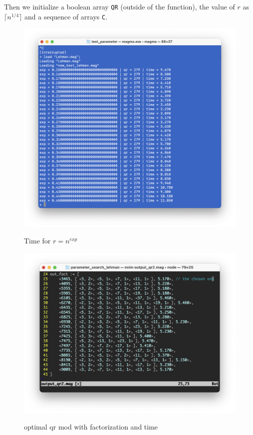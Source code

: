 \documentclass{article}
\theoremstyle{plain}
\theoremstyle{remark}
\theoremstyle{definition}
\begin{document}
Then we initialize a boolean array \texttt{QR} (outside of the function), the value of $r$ as $\lceil n^{1/4} \rceil$ and a sequence of arrays \texttt{C}. 



\begin{figure}[!tbp]
  \centering
  \begin{minipage}[b]{0.5\textwidth}
	\label{fig:r_choice}
    \includegraphics[width=\textwidth]{r_coiche.png}
    \caption{Time for $r = n^{exp }$ }
  \end{minipage}
  \hfill
  \begin{minipage}[b]{0.45\textwidth}
	  \label{fig:qr_choice}
    \includegraphics[width=\textwidth]{qr_choiche.png}
    \caption{optimal qr mod with factorization and time}
  \end{minipage}
\end{figure}
\end{document}
